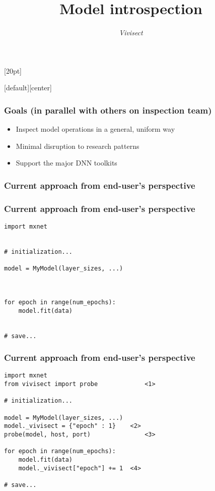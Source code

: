 \documentclass{beamer}
\title{\color{red}Model introspection}
\subtitle{\emph{Vivisect}}
\date{}
\begin{document}
\makeatletter
{}[20pt]{
  \def\beamer@cramped{\itemsep #1\topsep0.5pt\relax}}
\makeatother


[default][center]
\centering

\begin{frame}
\titlepage
\end{frame}


\renewcommand\lstlistingname{}
\renewcommand\thelstlisting{}
\lstset{style=mypython}


\begin{frame}[wide]
  \frametitle{Goals (in parallel with others on inspection team)}
  \pause
  \begin{block}{}
    \begin{itemize}
    \item Inspect model operations in a general, uniform way
    \item Minimal disruption to research patterns
    \item Support the major DNN toolkits
    \end{itemize}
  \end{block}
\end{frame}

\begin{frame}
\frametitle{Current approach from end-user's perspective}
\end{frame}


\begin{frame}[fragile]
  \frametitle{Current approach from end-user's perspective}  
  \begin{lstlisting}[caption={Simple training code}]
import mxnet
 
 
# initialization...
 
model = MyModel(layer_sizes, ...)
 
 
 
for epoch in range(num_epochs):
    model.fit(data)
 
 
# save...
\end{lstlisting}

\end{frame}


\begin{frame}[fragile]
  \frametitle{Current approach from end-user's perspective}
\begin{lstlisting}[caption={Add four lines}]
import mxnet
from vivisect import probe             <1>
 
# initialization...
 
model = MyModel(layer_sizes, ...)
model._vivisect = {"epoch" : 1}    <2>
probe(model, host, port)               <3>
 
for epoch in range(num_epochs):
    model.fit(data)
    model._vivisect["epoch"] += 1  <4>
 
# save...
\end{lstlisting}

\end{frame}
\end{document}
